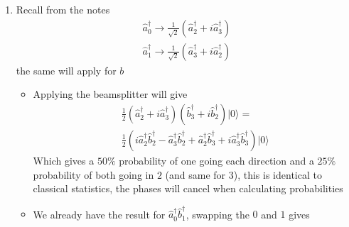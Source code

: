 \documentclass[english]{article}
\newcommand{\ket}[1]{|#1 \rangle}
\begin{document}
\begin{enumerate}
\begin{itemize}
 \textcolor{blue}{As a bonus, here is how to do the contour integral (safe to ignore): The denominator can be factored back into the product of two quantities which are linear in $\omega$ and complex conjugates of each other
 \begin{align}
 \mathrm{Re}[ \tilde{g}(\omega)]=\frac{\gamma}{(\omega_p-\omega)^2+\gamma^2}=\\
 \frac{\gamma}{(\omega_p+i\gamma-\omega)(\omega_p-i\gamma-\omega)}
 \end{align}
 From this formula, it is clear that there will be two simple poles, one in the upper half plane and one in the lower half plane at $\omega_p\pm i\gamma$. Since this function behaves as $\omega^-2$ in the limit of large $\omega$ we can safely close our contour around either the upper or lower half plane. If we close in the upper half plane, than the pole will take the form $\frac{1}{\omega_p-i\gamma-\omega}$ with a prefactor of $\frac{\gamma}{\omega_p+i\gamma-\omega}\rightarrow \frac{1}{2i}$, the residue from the pole will (as usual) be $2 \pi i$, multiplying this prefactor by the residue will give $\pi$.}
 \end{itemize}
 \item Recall from the notes
 \begin{align}
\hat{a}^{\dagger}_0\rightarrow \frac{1}{\sqrt{2}}(\hat{a}^{\dagger}_2+i\hat{a}^{\dagger}_3)\\
\hat{a}^{\dagger}_1\rightarrow \frac{1}{\sqrt{2}}(\hat{a}^{\dagger}_3+i\hat{a}^{\dagger}_2)
\end{align}
the same will apply for $b$
\begin{itemize}
\item Applying the beamsplitter will give
\begin{align}
\frac{1}{2}(\hat{a}^{\dagger}_2+i\hat{a}^{\dagger}_3)(\hat{b}^{\dagger}_3+i\hat{b}^{\dagger}_2)\ket{0}=\\
\frac{1}{2}(i\hat{a}^{\dagger}_2\hat{b}^{\dagger}_2-\hat{a}^{\dagger}_3\hat{b}^{\dagger}_2+\hat{a}^{\dagger}_2\hat{b}^{\dagger}_3+i\hat{a}^{\dagger}_3\hat{b}^{\dagger}_3)\ket{0}
\end{align}
Which gives a $50\%$ probability of one going each direction and a $25\%$ probability of both going in $2$ (and same for $3$), this is identical to classical statistics, the phases will cancel when calculating probabilities
\item We already have the result for $\hat{a}^{\dagger}_0\hat{b}^{\dagger}_1$, swapping the $0$ and $1$ gives
\begin{align}

\end{align}
\end{itemize}
\end{enumerate}
\end{document}
